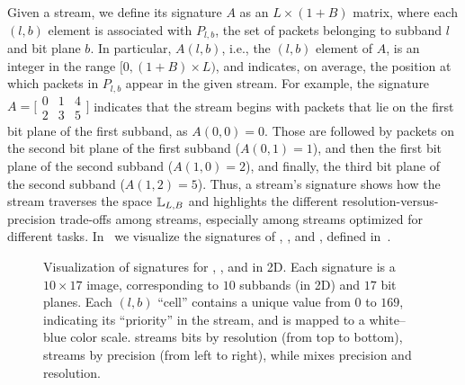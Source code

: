 Given a stream, we define its signature $A$ as an $L \times (1+B)$ matrix, where each $(l,b)$
element is associated with $P_{l,b}$, the set of packets belonging to subband $l$ and bit plane $b$.
In particular, $A(l,b)$, i.e., the $(l,b)$ element of $A$, is an integer in the range $[0,
(1+B)\times L)$, and indicates, on average, the position at which packets in $P_{l,b}$ appear in the
given stream. For example, the signature $A=\bigl[ \begin{smallmatrix}0 & 1 & 4\\
2 & 3 & 5\end{smallmatrix}\bigr]$ indicates that the stream begins with packets that lie on the
first bit plane of the first subband, as $A(0,0)=0$. Those are followed by packets on the second
bit plane of the first subband ($A(0,1)=1$), and then the first bit plane of the second subband
($A(1,0)=2$), and finally, the third bit plane of the second subband ($A(1,2)=5$). Thus, a
stream's signature shows how the stream traverses the space ${\mathbb L}_{L,B}$ and highlights the
different resolution-versus-precision trade-offs among streams, especially among \sopt streams
optimized for different tasks. In~ we visualize the signatures of
\sbit, \slvl, and \swav, defined in~.

\begin{figure}[!t]
\centering
\vspace{-0.5em}
\caption{Visualization of signatures for \slvl, \sbit, and \swav in 2D. Each signature is a
$10\times 17$ image, corresponding to $10$ subbands (in 2D) and $17$ bit planes. Each $(l,b)$
``cell'' contains a unique value from $0$ to $169$, indicating its ``priority'' in the stream, and
is mapped to a white--blue color scale. \slvl streams bits by resolution (from top to bottom), \sbit
streams by precision (from left to right), while \swav mixes precision and resolution.}
\label{fig:example-signatures}
\vspace{-1.5em}
\end{figure}

